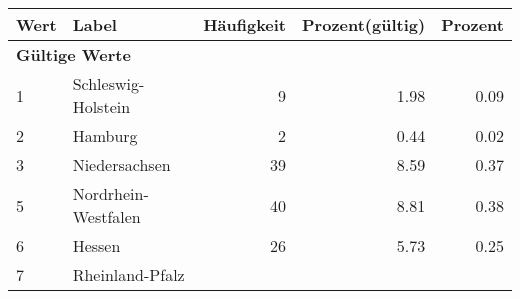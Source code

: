      \begin{longtable}{lXrrr}
     \toprule
     \textbf{Wert} & \textbf{Label} & \textbf{Häufigkeit} & \textbf{Prozent(gültig)} & \textbf{Prozent} \\
     \endhead
     \midrule
     \multicolumn{5}{l}{\textbf{Gültige Werte}}\\

     1 &
     \multicolumn{1}{X}{ Schleswig-Holstein   } &


       \num{9} &
       \num[round-mode=places,round-precision=2]{1,98} &
         \num[round-mode=places,round-precision=2]{0,09} \\

     2 &
     \multicolumn{1}{X}{ Hamburg   } &


       \num{2} &
       \num[round-mode=places,round-precision=2]{0,44} &
         \num[round-mode=places,round-precision=2]{0,02} \\

     3 &
     \multicolumn{1}{X}{ Niedersachsen   } &


       \num{39} &
       \num[round-mode=places,round-precision=2]{8,59} &
         \num[round-mode=places,round-precision=2]{0,37} \\

     5 &
     \multicolumn{1}{X}{ Nordrhein-Westfalen   } &


       \num{40} &
       \num[round-mode=places,round-precision=2]{8,81} &
         \num[round-mode=places,round-precision=2]{0,38} \\

     6 &
     \multicolumn{1}{X}{ Hessen   } &


       \num{26} &
       \num[round-mode=places,round-precision=2]{5,73} &
         \num[round-mode=places,round-precision=2]{0,25} \\

     7 &
     \multicolumn{1}{X}{ Rheinland-Pfalz   } &



\end{longtable}
